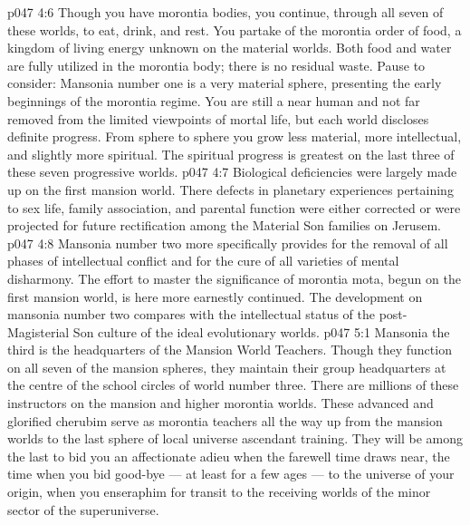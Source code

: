 \vs p047 4:6 Though you have morontia bodies, you continue, through all seven of these worlds, to eat, drink, and rest. You partake of the morontia order of food, a kingdom of living energy unknown on the material worlds. Both food and water are fully utilized in the morontia body; there is no residual waste. Pause to consider: Mansonia number one is a very material sphere, presenting the early beginnings of the morontia regime. You are still a near human and not far removed from the limited viewpoints of mortal life, but each world discloses definite progress. From sphere to sphere you grow less material, more intellectual, and slightly more spiritual. The spiritual progress is greatest on the last three of these seven progressive worlds.
\vs p047 4:7 Biological deficiencies were largely made up on the first mansion world. There defects in planetary experiences pertaining to sex life, family association, and parental function were either corrected or were projected for future rectification among the Material Son families on Jerusem.
\vs p047 4:8 Mansonia number two more specifically provides for the removal of all phases of intellectual conflict and for the cure of all varieties of mental disharmony. The effort to master the significance of morontia mota, begun on the first mansion world, is here more earnestly continued. The development on mansonia number two compares with the intellectual status of the post\hyp{}Magisterial Son culture of the ideal evolutionary worlds.
\vs p047 5:1 Mansonia the third is the headquarters of the Mansion World Teachers. Though they function on all seven of the mansion spheres, they maintain their group headquarters at the centre of the school circles of world number three. There are millions of these instructors on the mansion and higher morontia worlds. These advanced and glorified cherubim serve as morontia teachers all the way up from the mansion worlds to the last sphere of local universe ascendant training. They will be among the last to bid you an affectionate adieu when the farewell time draws near, the time when you bid good\hyp{}bye --- at least for a few ages --- to the universe of your origin, when you enseraphim for transit to the receiving worlds of the minor sector of the superuniverse.
